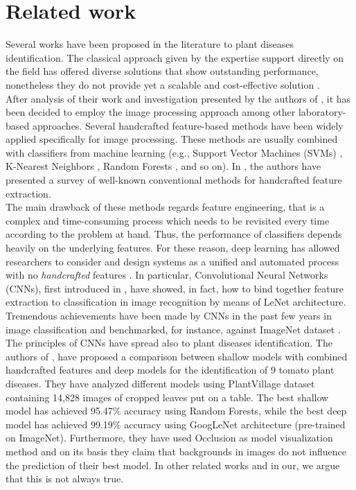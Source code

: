 \section{Related work}
Several works have been proposed in the literature to plant diseases identification. The classical approach given by the expertise support directly on the field has offered diverse solutions that show outstanding performance, nonetheless they do not provide yet a scalable and cost-effective solution \cite{ref17, ref18, ref16}.
\\\indent
After analysis of their work and investigation presented by the authors of \cite{ref15, ref14}, it has been decided to employ the image processing approach among other laboratory-based approaches. Several handcrafted feature-based methods have been widely applied specifically for image processing. These methods are usually combined with classifiers from machine learning (e.g., Support Vector Machines (SVMs) \cite{ref24}, K-Nearest Neighbors \cite{ref25}, Random Forests \cite{ref26}, and so on). In \cite{ref27}, the authors have presented a survey of well-known conventional methods for handcrafted feature extraction.
\\\indent
The main drawback of these methods regards feature engineering, that is a complex and time-consuming process which needs to be revisited every time according to the problem at hand. Thus, the performance of classifiers depends heavily on the underlying features. For these reason, deep learning has allowed researchers to consider and design systems as a unified and automated process with no \emph{handcrafted} features \cite{ref29}. In particular, Convolutional Neural Networks (CNNs), first introduced in \cite{ref30}, have showed, in fact, how to bind together feature extraction to classification in image recognition by means of LeNet architecture. Tremendous achievements have been made by CNNs in the past few years in image classification and benchmarked, for instance, against ImageNet dataset \cite{ref28}.
\\\indent
The principles of CNNs have spread also to plant diseases identification. The authors of \cite{ref11}, have proposed a comparison between shallow models with combined handcrafted features and deep models for the identification of 9 tomato plant diseases. They have analyzed different models using PlantVillage dataset containing 14,828 images of cropped leaves put on a table. The best shallow model has achieved 95.47\% accuracy using Random Forests, while the best deep model has achieved 99.19\% accuracy using GoogLeNet architecture (pre-trained on ImageNet). Furthermore, they have used Occlusion \cite{ref13} as model visualization method and on its basis they claim that backgrounds in images do not influence the prediction of their best model. In other related works \cite{ref33, ref10} and in our, we argue that this is not always true.
